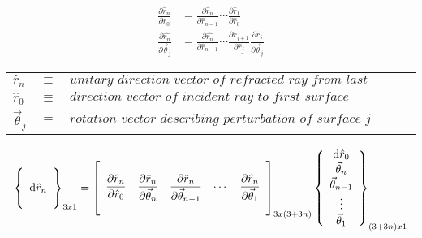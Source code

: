 \begin{table}[H]		%
\centering
\begin{subequations}
\label{eq:sensitivities}
\begin{align}
	\label{eq:drn_dr0}
	\frac{\partial\hat{r}_n}{\partial\hat{r}_0} &= \frac{\partial\hat{r}_n}{\partial\hat{r}_{n-1}} \cdots \frac{\partial\hat{r}_1}{\partial\hat{r}_0} \\[3mm]
	\label{eq:drn_dThj}
	\frac{\partial\hat{r_n}}{\partial\vec{\theta}_j} &= \frac{\partial\hat{r_n}}{\partial\hat{r}_{n-1}} \cdots \frac{\partial\hat{r}_{j+1}}{\partial\hat{r}_j} \frac{\partial\hat{r}_j}{\partial\vec{\theta}_j}
\end{align}
\end{subequations}
\begin{tabular}{lll}
$\hat{r}_n$ & $\equiv$ & $\textit{unitary direction vector of refracted ray from last surface}$ \\
$\hat{r}_0$ & $\equiv$ & $\textit{direction vector of incident ray to first surface}$ \\
$\vec{\theta}_j$ & $\equiv$ & $\textit{rotation vector describing perturbation of surface j}$ 
\end{tabular}
\end{table}

\begin{equation}		%
\label{eq:prismLinSys}
\left \{ 
	\begin{array}{c}
	\hspace{1mm} \\
	\textrm{d}\hat{r}_{n} \\
	\hspace{1mm}
	\end{array}
\right \}_{3x1} = 
\left [ 
	\begin{array}{ccccc}
	\hspace{1mm} \\
	\dfrac{\partial\hat{r}_n}{\partial\hat{r}_0} & \dfrac{\partial\hat{r}_n}{\partial\vec{\theta}_n} & \dfrac{\partial\hat{r}_n}{\partial\vec{\theta}_{n-1}} & \cdots & \dfrac{\partial\hat{r}_n}{\partial\vec{\theta}_1} \\
	\hspace{1mm}
	\end{array}
\right ]_{3x(3+3n)}
\left \{
	\begin{array}{c}
	\textrm{d}\hat{r}_{0} \\
	\vec{\theta}_{n} \\
	\vec{\theta}_{n-1} \\
	\vdots \\
	\vec{\theta}_1
	\end{array}
\right \}_{(3+3n)x1}
\end{equation}

